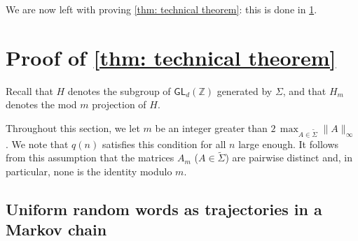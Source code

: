 \documentclass{article}
\def\alph{\tilde{\Sigma}}
\def\Z{\mathbb{Z}}
\def\GL{\textsf{GL}}
\theoremstyle{plain}
\theoremstyle{definition}
\begin{document}
We are now left with proving \cref{thm: technical theorem}: this is done in \cref{sec: non reduced words}.

\section{Proof of \cref{thm: technical theorem}}\label{sec: non reduced words}

Recall that $H$ denotes the subgroup of $\GL_d(\Z)$ generated by $\Sigma$, and that $H_m$ denotes the mod $m$ projection of $H$.

Throughout this section, we let $m$ be an integer greater than $2\,\max_{A\in \alph}\|A\|_\infty$. We note that $q(n)$ satisfies this condition for all $n$ large enough. It follows from this assumption that the matrices $A_m$ ($A\in \alph$) are pairwise distinct and, in particular, none is the identity modulo $m$.


\subsection{Uniform random words as trajectories in a Markov chain}
\end{document}
